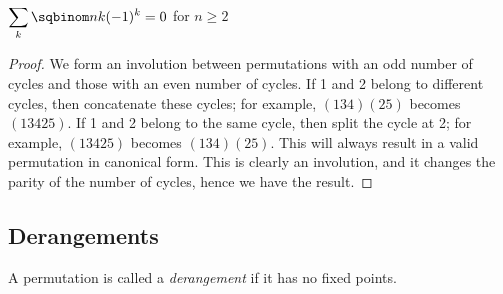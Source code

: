 \documentclass[a4paper]{article}
\begin{document}
\begin{proposition}
$\displaystyle\sum_{k}\sqbinom nk(-1)^k=0$ for $n\geq2$

\begin{hl}
\begin{proof}
We form an involution between permutations with an odd number of cycles and those with an even number of cycles. If 1 and 2 belong to different cycles, then concatenate these cycles; for example, $(134)(25)$ becomes $(13425)$. If 1 and 2 belong to the same cycle, then split the cycle at 2; for example, $(13425)$ becomes $(134)(25)$. This will always result in a valid permutation in canonical form. This is clearly an involution, and it changes the parity of the number of cycles, hence we have the result.
\end{proof}
\end{hl}
\end{proposition}

\subsection{Derangements}

\begin{definition}
A permutation is called a \emph{derangement} if it has no fixed points.
\end{definition}
\end{document}
